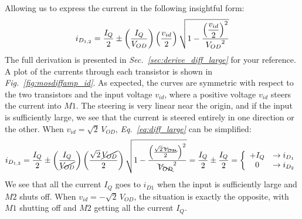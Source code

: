 Allowing us to express the current in the following insightful form:
    \begin{equation} 
        i_{D_{1,2}} = \frac{I_Q}{2} \pm \left(\frac{I_Q}{V_{OD}}\right) \left(\frac{v_{id}}{2}\right)
                        \sqrt{1 - \frac{{\mathlarger{\left(\frac{v_{id}}{2}\right)}}^2}{{V_{OD}}^2}}
        \label{eq:diff_large}
    \end{equation}
The full derivation is presented in \emph{Sec.~\ref{sec:derive_diff_large}} for your reference.  A plot of the currents through each transistor is shown in \emph{Fig.~\ref{fig:mosdiffamp_id}}.  As expected, the curves are symmetric with respect to the two transistors and the input voltage $v_{id}$, where a positive voltage $v_{id}$ steers the current into $M1$.  The steering is very linear near the origin, and if the input is sufficiently large, we see that the current is steered entirely in one direction or the other.  When $v_{id} = \sqrt{2}\,V_{OD}$, \emph{Eq.~\ref{eq:diff_large}} can be simplified:
    \begin{equation} 
        i_{D_{1,2}} = \frac{I_Q}{2} \pm \left(\frac{I_Q}{\cancel{V_{OD}}}\right) \left(\frac{\sqrt{2}\,\cancel{V_{OD}}}{2}\right)
                        \sqrt{1 - \frac{{\left(\frac{\sqrt{2}\,\bcancel{V_{OD}}}{2}\right)}^2}{{\bcancel{V_{OD}}}^2}}
                    = \frac{I_Q}{2} \pm \frac{I_Q}{2}
                    = \left\{\begin{array}{c c}
                        +I_Q & \to i_{D_1}\\
                        0 & \to i_{D_2}
                    \end{array}\right.
    \end{equation}
We see that all the current $I_Q$ goes to $i_{D1}$ when the input is sufficiently large and $M2$ shuts off.  When $v_{id} = -\sqrt{2}\,V_{OD}$, the situation is exactly the opposite, with $M1$ shutting off and $M2$ getting all the current $I_Q$.

